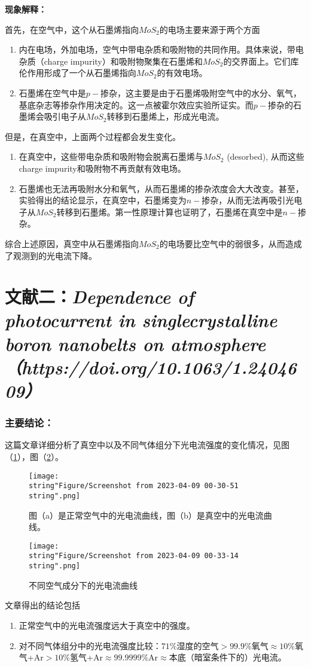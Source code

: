 \documentclass[english]{ctexart}
\begin{document}
\textbf{现象解释：}

首先，在空气中，这个从石墨烯指向$MoS_{2}$的电场主要来源于两个方面
\begin{enumerate}
\item 内在电场，外加电场，空气中带电杂质和吸附物的共同作用。具体来说，带电杂质（charge impurity）和吸附物聚集在石墨烯和$MoS_{2}$的交界面上。它们库伦作用形成了一个从石墨烯指向$MoS_{2}$的有效电场。
\item 石墨烯在空气中是$p-$掺杂，这主要是由于石墨烯吸附空气中的水分、氧气，基底杂志等掺杂作用决定的。这一点被霍尔效应实验所证实。而$p-$掺杂的石墨烯会吸引电子从$MoS_{2}$转移到石墨烯上，形成光电流。
\end{enumerate}
但是，在真空中，上面两个过程都会发生变化。
\begin{enumerate}
\item 在真空中，这些带电杂质和吸附物会脱离石墨烯与$MoS_{2}$ (desorbed), 从而这些charge impurity和吸附物不再贡献有效电场。
\item 石墨烯也无法再吸附水分和氧气，从而石墨烯的掺杂浓度会大大改变。甚至，实验得出的结论显示，在真空中，石墨烯变为$n-$掺杂，从而无法再吸引光电子从$MoS_{2}$转移到石墨烯。第一性原理计算也证明了，石墨烯在真空中是$n-$掺杂。
\end{enumerate}
综合上述原因，真空中从石墨烯指向$MoS_{2}$的电场要比空气中的弱很多，从而造成了观测到的光电流下降。

\part{文献二：\emph{Dependence of photocurrent in singlecrystalline boron nanobelts
on atmosphere （https://doi.org/10.1063/1.2404609）}}

\section{主要结论：}

这篇文章详细分析了真空中以及不同气体组分下光电流强度的变化情况，见图（\ref{fig2}），图（\ref{fig3}）。

\begin{figure}
\texttt{[image: \\string"Figure/Screenshot from 2023-04-09 00-30-51\\string".png]}

\caption{图（a）是正常空气中的光电流曲线，图（b）是真空中的光电流曲线。}

\label{fig2}
\end{figure}

\begin{figure}
\texttt{[image: \\string"Figure/Screenshot from 2023-04-09 00-33-14\\string".png]}

\caption{不同空气成分下的光电流曲线}

\label{fig3}
\end{figure}
文章得出的结论包括
\begin{enumerate}
\item 正常空气中的光电流强度远大于真空中的强度。
\item 对不同气体组分中的光电流强度比较：$71\%$湿度的空气$>$$99.9\%$氧气$\approx$$10\%$氧气+Ar$>$$10\%$氢气+Ar$\approx$$99.9999\%$Ar$\approx$本底（暗室条件下的）光电流。
\end{enumerate}
\end{document}
